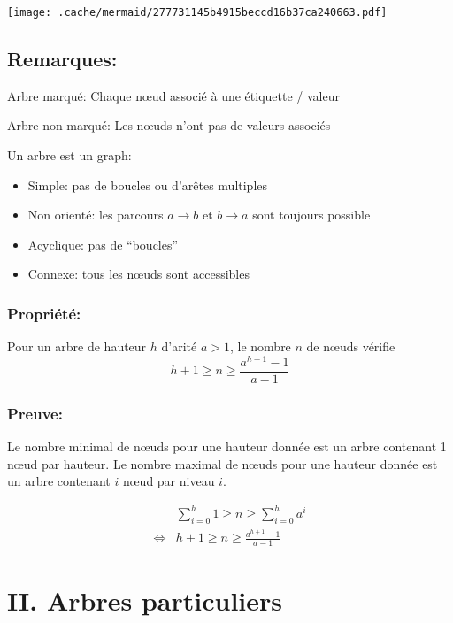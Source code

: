 \texttt{[image: .cache/mermaid/277731145b4915beccd16b37ca240663.pdf]}

\hypertarget{remarques}{%
\subsection{Remarques:}\label{remarques}}

Arbre marqué: Chaque nœud associé à une étiquette / valeur

Arbre non marqué: Les nœuds n'ont pas de valeurs associés

Un arbre est un graph:

\begin{itemize}
\tightlist
\item
  Simple: pas de boucles ou d'arêtes multiples
\item
  Non orienté: les parcours \(a \to b\) et \(b \to a\) sont toujours
  possible
\item
  Acyclique: pas de ``boucles''
\item
  Connexe: tous les nœuds sont accessibles
\end{itemize}

\hypertarget{propriuxe9tuxe9}{%
\subsubsection{Propriété:}\label{propriuxe9tuxe9}}

Pour un arbre de hauteur \(h\) d'arité \(a>1\), le nombre \(n\) de nœuds
vérifie \[ h + 1 \geqslant n \geqslant \frac{a^{h+1} - 1}{a - 1} \]

\hypertarget{preuve}{%
\subsubsection{Preuve:}\label{preuve}}

Le nombre minimal de nœuds pour une hauteur donnée est un arbre
contenant 1 nœud par hauteur. Le nombre maximal de nœuds pour une
hauteur donnée est un arbre contenant \(i\) nœud par niveau \(i\).

\begin{align*}
    &\sum_{i=0}^h 1 \geqslant n \geqslant \sum_{i=0}^h a^i\\
    \iff& h + 1 \geqslant n \geqslant \frac{a^{h+1}-1}{a-1}
\end{align*}

\hypertarget{ii.-arbres-particuliers}{%
\section{II. Arbres particuliers}\label{ii.-arbres-particuliers}}

